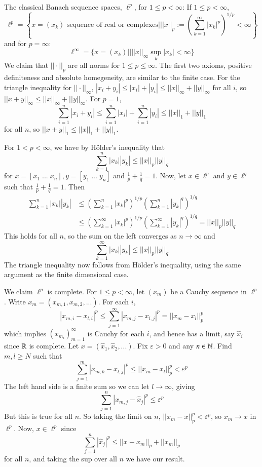 \begin{eg}
    The classical Banach sequence spaces, $\ell^p$, for $1 \leq p < \infty$: If $1 \leq p < \infty$, $$\ell^p = \left\{x=(x_k)\text{ sequence of real or complexes}\vert||x||_p := \left(\sum_{k=1}^{\infty}|x_k|^p\right)^{1/p} < \infty\right\}$$ and for $p = \infty$: $$\ell^{\infty} = \{x=(x_k)\vert \vert ||x||_{\infty}\sup_k|x_k| < \infty\}$$ We claim that $||\cdot||_p$ are all norms for $1 \leq p \leq \infty$. The first two axioms, positive definiteness and absolute homegeneity, are similar to the finite case. For the triangle inequality for $||\cdot||_{\infty}$, $|x_i+y_i|\leq |x_i|+|y_i|\leq ||x||_{\infty}+||y||_{\infty}$ for all $i$, so $||x+y||_{\infty} \leq ||x||_{\infty}+||y||_{\infty}$. 
    For $p = 1$, $$\sum_{i=1}^n|x_i + y_i| \leq \sum_{i=1}^n|x_i| + \sum_{i=1}^n|y_i| \leq ||x||_1+||y||_1$$ for all $n$, so $||x+y||_1 \leq ||x||_1+||y||_1$.

    For $1 < p < \infty$, we have by H\"{o}lder's inequality that $$\sum_{k=1}^n|x_k||y_k| \leq ||x||_p||y||_q$$ for $x = [x_1\;...\;x_n],y = [y_1\;...\;y_n]$ and $\frac{1}{p}+\frac{1}{q} = 1$. Now, let $x \in \ell^p$ and $y \in \ell^q$ such that $\frac{1}{p}+\frac{1}{q} = 1$. Then \begin{align*}
        \sum_{k=1}^n|x_k||y_k| &\leq \left(\sum_{k=1}^n|x_k|^p\right)^{1/p}\left(\sum_{k=1}^n|y_k|^q\right)^{1/q} \\
        &\leq \left(\sum_{k=1}^{\infty}|x_k|^p\right)^{1/p}\left(\sum_{k=1}^{\infty}|y_k|^q\right)^{1/q} = ||x||_p||y||_q
    \end{align*}
    This holds for all $n$, so the sum on the left converges as $n\rightarrow \infty$ and $$\sum_{k=1}^{\infty}|x_k||y_k| \leq ||x||_p||y||_q$$ The triangle inequality now follows from H\"{o}lder's inequality, using the same argument as the finite dimensional case.

    We claim $\ell^p$ is complete. For $1 \leq p < \infty$, let $(x_m)$ be a Cauchy sequence in $\ell^p$. Write $x_m = (x_{m,1},x_{m,2},...)$. For each $i$, $$|x_{m,i} - x_{l,i}|^p \leq \sum_{j=1}^{\infty}|x_{m,j}-x_{l,j}|^p = ||x_m - x_l||_p^p$$ which implies $(x_{m_i})_{m=1}^{\infty}$ is Cauchy for each $i$, and hence has a limit, say $\hat{x}_i$ since $\mathbb R$ is complete. Let $x = (\hat{x}_1,\hat{x}_2,...)$. Fix $\varepsilon > 0$ and any $n \in \mathbb N$. Find $m,l \geq N$ such that $$\sum_{j=1}^m|x_{m,k} - x_{l,j}|^p\leq ||x_m - x_l||_p^p < \varepsilon^p$$ The left hand side is a finite sum so we can let $l\rightarrow \infty$, giving $$\sum_{j=1}^n|x_{m,j} - \hat{x}_j|^p\leq \varepsilon^p$$ But this is true for all $n$. So taking the limit on $n$, $||x_m-x||_p^p < \varepsilon^p$, so $x_m\rightarrow x$ in $\ell^p$. Now, $x \in \ell^p$ since $$\sum_{j=1}^n|\hat{x}_j|^p \leq ||x-x_m||_p + ||x_m||_p$$ for all $n$, and taking the sup over all $n$ we have our result.
\end{eg}

